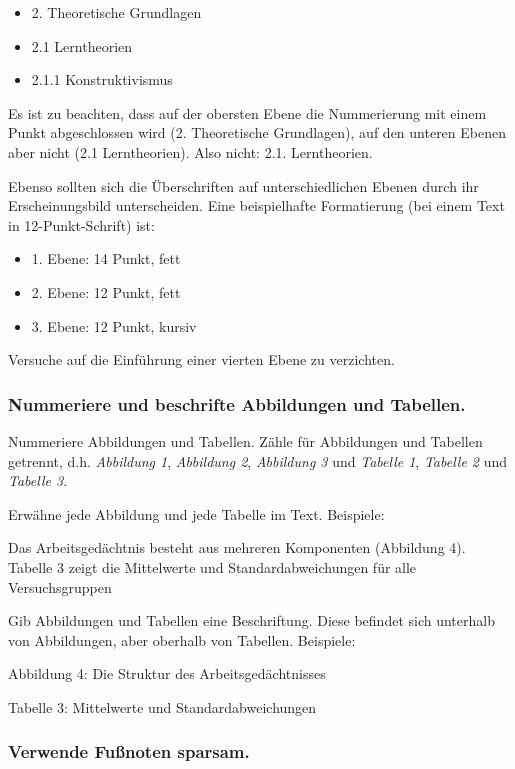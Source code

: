 \documentclass{../cssheet}
\begin{document}
\begin{itemize}
\item
  2. Theoretische Grundlagen
\item
  2.1 Lerntheorien
\item
  2.1.1 Konstruktivismus
\end{itemize}

Es ist zu beachten, dass auf der obersten Ebene die Nummerierung mit
einem Punkt abgeschlossen wird (\glqq{}2. Theoretische Grundlagen\grqq{}), auf den
unteren Ebenen aber nicht (\glqq{}2.1 Lerntheorien\grqq{}). Also nicht: \glqq{}2.1.
Lerntheorien\grqq{}.

Ebenso sollten sich die Überschriften auf unterschiedlichen Ebenen durch
ihr Erscheinungsbild unterscheiden. Eine beispielhafte Formatierung (bei
einem Text in 12-Punkt-Schrift) ist:

\begin{itemize}
\item
  1. Ebene: 14 Punkt, fett
\item
  2. Ebene: 12 Punkt, fett
\item
  3. Ebene: 12 Punkt, kursiv
\end{itemize}

Versuche auf die Einführung einer vierten Ebene zu verzichten.

\subsubsection*{Nummeriere und beschrifte Abbildungen und Tabellen.}

Nummeriere Abbildungen und Tabellen. Zähle für Abbildungen und Tabellen
getrennt, d.h. \emph{Abbildung 1}, \emph{Abbildung 2}, \emph{Abbildung 3} und \emph{Tabelle
1}, \emph{Tabelle 2} und \emph{Tabelle 3}.

Erwähne jede Abbildung und jede Tabelle im Text. Beispiele:

Das Arbeitsgedächtnis besteht aus mehreren Komponenten (Abbildung 4).
Tabelle 3 zeigt die Mittelwerte und Standardabweichungen für alle
Versuchsgruppen

Gib Abbildungen und Tabellen eine Beschriftung. Diese befindet sich
unterhalb von Abbildungen, aber oberhalb von Tabellen. Beispiele:

Abbildung 4: Die Struktur des Arbeitsgedächtnisses

Tabelle 3: Mittelwerte und Standardabweichungen

\subsubsection*{Verwende Fußnoten sparsam.}
\end{document}
